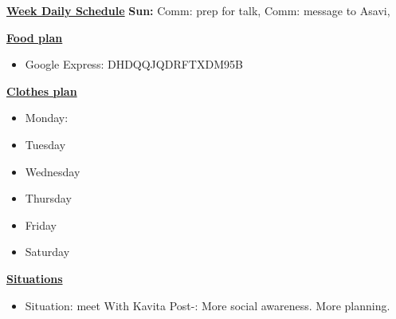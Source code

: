 \underline{\bf Week Daily Schedule}
        {\bf Sun:}  Comm: prep for talk, Comm: message to Asavi,
\fi






    
      
      \underline{ \bf Food plan } \\
        \begin{itemize}
          \tiny \item \tiny Google Express: DHDQQJQDRFTXDM95B
        \end{itemize}
      
        {\underline \bf Clothes plan} 
        \begin{itemize}
          \tiny \item \tiny Monday: 
        \item \tiny Tuesday
        \item \tiny Wednesday
        \item \tiny Thursday
        \item \tiny Friday
        \item \tiny Saturday
        \end{itemize} 
    
      
        {\underline \bf Situations}
        \begin{itemize}
          \tiny \item \tiny Situation: meet With Kavita  Post-: More
          social awareness. More planning.
        \end{itemize}

